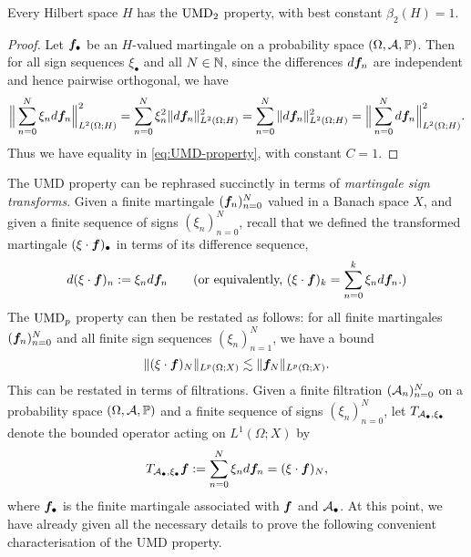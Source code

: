 \begin{prop}\label{prop:Hilbert-UMD2}
  Every Hilbert space $H$ has the $\mathrm{UMD}_{2}$ property, with best constant $\beta_{2}(H) = 1$.
\end{prop}

\begin{proof}
  Let $\bm{f}_{\bullet}$ be an $H$-valued martingale on a probability space $(\Omega,\mathcal{A},\mathbb{P})$.
  Then for all sign sequences $\xi_{\bullet}$ and all $N \in \mathbb{N}$, since the differences $d\bm{f}_{n}$ are independent and hence pairwise orthogonal, we have
  \begin{equation*}
    \Big\| \sum_{n=0}^N \xi_{n} d\bm{f}_{n} \Big\|_{L^2(\Omega;H)}^{2}
    = \sum_{n = 0}^{N} \xi_{n}^{2} \|d\bm{f}_{n}\|_{L^2(\Omega;H)}^{2}
    = \sum_{n = 0}^{N} \|d\bm{f}_{n}\|_{L^2(\Omega;H)}^{2}
    = \Big\| \sum_{n=0}^N d\bm{f}_{n} \Big\|_{L^2(\Omega;H)}^{2}.
  \end{equation*}
  Thus we have equality in \eqref{eq:UMD-property}, with constant $C = 1$.
\end{proof}

The UMD property can be rephrased succinctly in terms of \emph{martingale sign transforms}.
Given a finite martingale $(\bm{f}_{n})_{n=0}^{N}$ valued in a Banach space $X$, and given a finite sequence of signs $(\xi_{n})_{n=0}^{N}$, recall that we defined the transformed martingale $(\xi \cdot \bm{f})_{\bullet}$ in terms of its difference sequence,
\begin{equation*}
  d(\xi \cdot \bm{f})_{n} := \xi_{n} d\bm{f}_{n} \qquad \text{(or equivalently, $(\xi \cdot \bm{f})_{k} = \sum_{n=0}^{k} \xi_{n} d\bm{f}_{n}$.)}
\end{equation*}
The $\mathrm{UMD}_{p}$ property can then be restated as follows: for all finite martingales $(\bm{f}_{n})_{n=0}^{N}$ and all finite sign sequences $(\xi_{n})_{n=1}^{N}$, we have a bound
\begin{equation*}
  \|(\xi \cdot \bm{f})_{N}\|_{L^p(\Omega;X)} \lesssim \|\bm{f}_{N}\|_{L^p(\Omega;X)}.
\end{equation*}
This can be restated in terms of filtrations.
Given a finite filtration $(\mathcal{A}_{n})_{n=0}^{N}$ on a probability space $(\Omega,\mathcal{A},\mathbb{P})$ and a finite sequence of signs $(\xi_{n})_{n=0}^{N}$, let $T_{\mathcal{A}_{\bullet}, \xi_{\bullet}}$ denote the bounded operator acting on $L^1(\Omega;X)$ by
\begin{equation*}
  T_{\mathcal{A}_{\bullet}, \xi_{\bullet}} \bm{f} := \sum_{n=0}^{N} \xi_{n} d\bm{f}_{n} = (\xi \cdot \bm{f})_{N},
\end{equation*}
where $\bm{f}_{\bullet}$ is the finite martingale associated with $\bm{f}$ and $\mathcal{A}_{\bullet}$.
At this point, we have already given all the necessary details to prove the following convenient characterisation of the UMD property.

